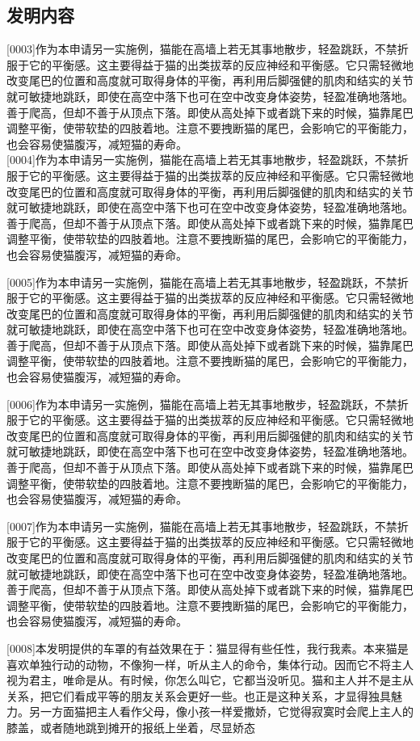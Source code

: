 \documentclass[hyperref]{ctexart}
\begin{document}
	\subsection*{发明内容}
	\begin{flushleft}
		{\large [0003]\quad 作为本申请另一实施例，猫能在高墙上若无其事地散步，轻盈跳跃，不禁折服于它的平衡感。这主要得益于猫的出类拔萃的反应神经和平衡感。它只需轻微地改变尾巴的位置和高度就可取得身体的平衡，再利用后脚强健的肌肉和结实的关节就可敏捷地跳跃，即使在高空中落下也可在空中改变身体姿势，轻盈准确地落地。善于爬高，但却不善于从顶点下落。即使从高处掉下或者跳下来的时候，猫靠尾巴调整平衡，使带软垫的四肢着地。注意不要拽断猫的尾巴，会影响它的平衡能力，也会容易使猫腹泻，减短猫的寿命。\\
			
			[0004]\quad 作为本申请另一实施例，猫能在高墙上若无其事地散步，轻盈跳跃，不禁折服于它的平衡感。这主要得益于猫的出类拔萃的反应神经和平衡感。它只需轻微地改变尾巴的位置和高度就可取得身体的平衡，再利用后脚强健的肌肉和结实的关节就可敏捷地跳跃，即使在高空中落下也可在空中改变身体姿势，轻盈准确地落地。善于爬高，但却不善于从顶点下落。即使从高处掉下或者跳下来的时候，猫靠尾巴调整平衡，使带软垫的四肢着地。注意不要拽断猫的尾巴，会影响它的平衡能力，也会容易使猫腹泻，减短猫的寿命。
			
			[0005]\quad 作为本申请另一实施例，猫能在高墙上若无其事地散步，轻盈跳跃，不禁折服于它的平衡感。这主要得益于猫的出类拔萃的反应神经和平衡感。它只需轻微地改变尾巴的位置和高度就可取得身体的平衡，再利用后脚强健的肌肉和结实的关节就可敏捷地跳跃，即使在高空中落下也可在空中改变身体姿势，轻盈准确地落地。善于爬高，但却不善于从顶点下落。即使从高处掉下或者跳下来的时候，猫靠尾巴调整平衡，使带软垫的四肢着地。注意不要拽断猫的尾巴，会影响它的平衡能力，也会容易使猫腹泻，减短猫的寿命。
			
			[0006]\quad 作为本申请另一实施例，猫能在高墙上若无其事地散步，轻盈跳跃，不禁折服于它的平衡感。这主要得益于猫的出类拔萃的反应神经和平衡感。它只需轻微地改变尾巴的位置和高度就可取得身体的平衡，再利用后脚强健的肌肉和结实的关节就可敏捷地跳跃，即使在高空中落下也可在空中改变身体姿势，轻盈准确地落地。善于爬高，但却不善于从顶点下落。即使从高处掉下或者跳下来的时候，猫靠尾巴调整平衡，使带软垫的四肢着地。注意不要拽断猫的尾巴，会影响它的平衡能力，也会容易使猫腹泻，减短猫的寿命。
			
			[0007]\quad 作为本申请另一实施例，猫能在高墙上若无其事地散步，轻盈跳跃，不禁折服于它的平衡感。这主要得益于猫的出类拔萃的反应神经和平衡感。它只需轻微地改变尾巴的位置和高度就可取得身体的平衡，再利用后脚强健的肌肉和结实的关节就可敏捷地跳跃，即使在高空中落下也可在空中改变身体姿势，轻盈准确地落地。善于爬高，但却不善于从顶点下落。即使从高处掉下或者跳下来的时候，猫靠尾巴调整平衡，使带软垫的四肢着地。注意不要拽断猫的尾巴，会影响它的平衡能力，也会容易使猫腹泻，减短猫的寿命。
			
			[0008]\quad 本发明提供的车罩的有益效果在于：猫显得有些任性，我行我素。本来猫是喜欢单独行动的动物，不像狗一样，听从主人的命令，集体行动。因而它不将主人视为君主，唯命是从。有时候，你怎么叫它，它都当没听见。猫和主人并不是主从关系，把它们看成平等的朋友关系会更好一些。也正是这种关系，才显得独具魅力。另一方面猫把主人看作父母，像小孩一样爱撒娇，它觉得寂寞时会爬上主人的膝盖，或者随地跳到摊开的报纸上坐着，尽显娇态}
		
	\end{flushleft}
	
	
\end{document}
